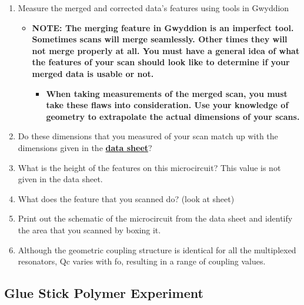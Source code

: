 \documentclass{../lab}
\begin{document}
{\begin{enumerate}
    \item Measure the merged and corrected data's features using tools in Gwyddion

    \begin{itemize}
        \item ​​\textbf{NOTE: The merging feature in Gwyddion is an imperfect tool.  Sometimes scans will merge seamlessly. Other times they will not merge properly at all. You must have a general idea of what the features of your scan should look like to determine if your merged data is usable or not.}

        \begin{itemize}
            \item \textbf{​When taking measurements of the merged scan, you must take these flaws into consideration.  Use your knowledge of geometry to extrapolate the actual dimensions of your scans.}

        \end{itemize}

    \end{itemize}

    \item Do these dimensions that you measured of your scan match up with the dimensions given in the \href{http://experimentationlab.berkeley.edu/sites/default/files/AFMImages/CSQ\_Resonators\_1July2011\%20.pdf}{\textbf{data sheet}}?

    \item What is the height of the features on this microcircuit?  This value is not given in the data sheet.

    \item What does the feature that you scanned do? (look at sheet)

    \item Print out the schematic of the microcircuit from the data sheet and identify the area that you scanned by boxing it.

    \item Although the geometric coupling structure is identical for all the multiplexed resonators, Qc varies with fo, resulting in a range of coupling values.

\end{enumerate}

\subsection{Glue Stick Polymer Experiment}

}
\end{document}
